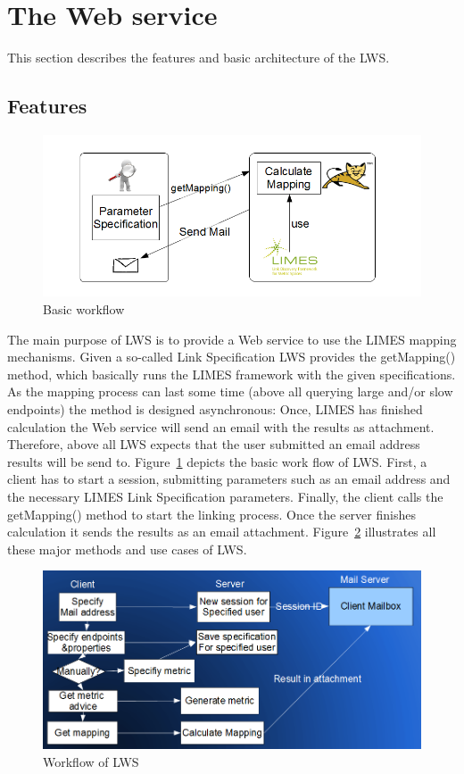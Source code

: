 \documentclass{article}
\begin{document}
\section{The Web service}
This section describes the features and basic architecture of the LWS.
\subsection{Features}
\begin{figure}[htbp]
	\centering
		\includegraphics[width=7in]{images/limes_webservice_workflow_skizze_for_dummies.png}
	\caption{Basic workflow}
	\label{fig:limes_webservice_workflow_skizze_for_dummies}
\end{figure}
The main purpose of LWS is to provide a Web service to use the LIMES mapping mechanisms. Given a so-called Link Specification LWS provides the getMapping() method, which basically runs the LIMES framework with the given specifications. As the mapping process can last some time (above all querying large and/or slow endpoints) the method is designed asynchronous: Once, LIMES has finished calculation the Web service  will send an email with the results as attachment. Therefore, above all LWS expects that the user submitted an email address results will be send to.
Figure~\ref{fig:limes_webservice_workflow_skizze_for_dummies} depicts the basic work flow of LWS. First, a client has to start a session, submitting parameters such as an email address and the necessary LIMES Link Specification parameters. Finally, the client calls the getMapping() method to start the linking process. Once the server finishes calculation it sends the results as an email attachment. Figure~\ref{fig:workflow2} illustrates all these major methods and use cases of LWS.
\begin{figure}[h]
	\centering
		\includegraphics[width=7in]{images/workflow2.png}
	\caption{Workflow of LWS}
	\label{fig:workflow2}
\end{figure}
\end{document}
